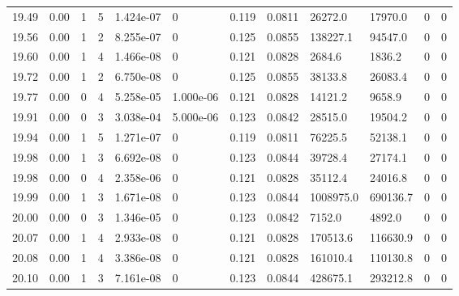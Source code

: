 \documentclass[preview]{standalone}
\begin{document}
{{{{{\begin{tabular}{L{1.2cm}C{1.2cm} C{0.3cm}C{0.5cm} C{1.4cm}C{1.4cm} C{1.4cm}C{1.4cm} C{1.6cm}C{1.6cm} C{1.6cm}C{1.6cm}}
  19.49  &  0.00  & 1     &  5 &  1.424e-07  & 0  &  0.119&   0.0811& 26272.0 & 17970.0   &  0 & 0  \\ 
  19.56  &  0.00  & 1     &  2 &  8.255e-07  & 0  &  0.125&   0.0855& 138227.1 & 94547.0   &  0 & 0  \\ 
  19.60  &  0.00  & 1     &  4 &  1.466e-08  & 0  &  0.121&   0.0828& 2684.6 & 1836.2   &  0 & 0  \\ 
  19.72  &  0.00  & 1     &  2 &  6.750e-08  & 0  &  0.125&   0.0855& 38133.8 & 26083.4   &  0 & 0  \\ 
  19.77  &  0.00  & 0     &  4 &  5.258e-05  & 1.000e-06  &  0.121&   0.0828& 14121.2 & 9658.9   &  0 & 0  \\ 
  19.91  &  0.00  & 0     &  3 &  3.038e-04  & 5.000e-06  &  0.123&   0.0842& 28515.0 & 19504.2   &  0 & 0  \\ 
  19.94  &  0.00  & 1     &  5 &  1.271e-07  & 0  &  0.119&   0.0811& 76225.5 & 52138.1   &  0 & 0  \\ 
  19.98  &  0.00  & 1     &  3 &  6.692e-08  & 0  &  0.123&   0.0844& 39728.4 & 27174.1   &  0 & 0  \\ 
  19.98  &  0.00  & 0     &  4 &  2.358e-06  & 0  &  0.121&   0.0828& 35112.4 & 24016.8   &  0 & 0  \\ 
  19.99  &  0.00  & 1     &  3 &  1.671e-08  & 0  &  0.123&   0.0844& 1008975.0 & 690136.7   &  0 & 0  \\ 
  20.00  &  0.00  & 0     &  3 &  1.346e-05  & 0  &  0.123&   0.0842& 7152.0 & 4892.0   &  0 & 0  \\ 
  20.07  &  0.00  & 1     &  4 &  2.933e-08  & 0  &  0.121&   0.0828& 170513.6 & 116630.9   &  0 & 0  \\ 
  20.08  &  0.00  & 1     &  4 &  3.386e-08  & 0  &  0.121&   0.0828& 161010.4 & 110130.8   &  0 & 0  \\ 
  20.10  &  0.00  & 1     &  3 &  7.161e-08  & 0  &  0.123&   0.0844& 428675.1 & 293212.8   &  0 & 0  \\ 
\hline 
\end{tabular} 

}}}}}
\end{document}
